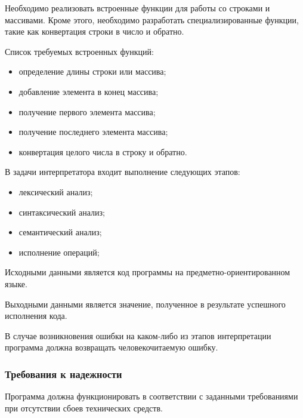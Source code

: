 Необходимо реализовать встроенные функции для работы со строками и массивами.
Кроме этого, необходимо разработать специализированные функции, такие как конвертация строки в число и обратно.

Список требуемых встроенных функций:

\begin{itemize}
    \item определение длины строки или массива;
    \item добавление элемента в конец массива;
    \item получение первого элемента массива;
    \item получение последнего элемента массива;
    \item конвертация целого числа в строку и обратно.
\end{itemize}

В задачи интерпретатора входит выполнение следующих этапов:
\begin{itemize}
	\item лексический анализ;
	\item синтаксический анализ;
	\item семантический анализ;
	\item исполнение операций;
\end{itemize}

Исходными данными является код программы на предметно-ориентированном языке.

Выходными данными является значение, полученное в результате успешного исполнения кода.

В случае возникновения ошибки на каком-либо из этапов интерпретации программа должна возвращать человекочитаемую ошибку.



\subsubsection{Требования к надежности}

Программа должна функционировать в соответствии с заданными требованиями при отсутствии сбоев технических средств.
